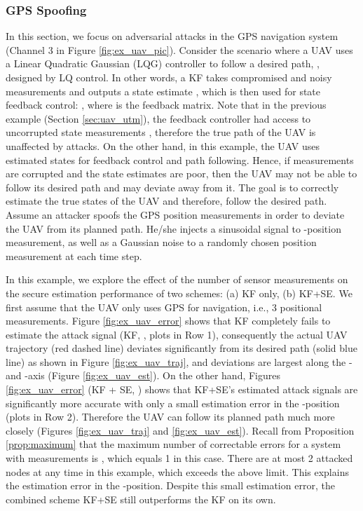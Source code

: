 \documentclass[journal]{IEEEtran}
\begin{document}
\subsubsection{GPS Spoofing}

In this section, we focus on adversarial attacks in the GPS navigation system (Channel 3 in Figure \ref{fig:ex_uav_pic}). Consider the scenario where a UAV uses a Linear Quadratic Gaussian (LQG) controller to follow a desired path, , designed by LQ control. In other words, a KF takes compromised and noisy measurements  and outputs a state estimate , which is then used for state feedback control: , where  is the feedback matrix. Note that in the previous example (Section \ref{sec:uav_utm}), the feedback controller had access to uncorrupted state measurements , therefore the true path of the UAV is unaffected by attacks. On the other hand, in this example, the UAV uses estimated states  for feedback control and path following. Hence, if measurements are corrupted and the state estimates are poor, then the UAV may not be able to follow its desired path and may deviate away from it. The goal is to correctly estimate the true states of the UAV and therefore, follow the desired path. Assume an attacker spoofs the GPS position measurements in order to deviate the UAV from its planned path. He/she injects a sinusoidal signal to -position measurement, as well as a Gaussian noise to a randomly chosen position measurement at each time step. 

In this example, we explore the effect of the number of sensor measurements on the secure estimation performance of two schemes: (a) KF only, (b) KF+SE.
We first assume that the UAV only uses GPS for navigation, i.e., 3 positional measurements. 
Figure \ref{fig:ex_uav_error} shows that KF completely fails to estimate the attack signal (KF, , plots in Row 1), consequently the actual UAV trajectory (red dashed line)  deviates significantly from its desired path (solid blue line) as shown in Figure \ref{fig:ex_uav_traj}, and deviations are largest along the - and -axis (Figure \ref{fig:ex_uav_est}).
On the other hand, Figures \ref{fig:ex_uav_error} (KF + SE, ) shows that KF+SE's estimated attack signals are significantly more accurate with only a small estimation error in the -position (plots in Row 2). 
Therefore the UAV can follow its planned path much more closely (Figures \ref{fig:ex_uav_traj}  and \ref{fig:ex_uav_est}).
Recall from Proposition \ref{prop:maximum} that the maximum number of correctable errors for a system with  measurements is , which equals 1 in this case. There are at most 2 attacked nodes at any time  in this example, which exceeds the above limit. This explains the estimation error in the -position. Despite this small estimation error, the combined scheme KF+SE still outperforms the KF on its own.
\end{document}
